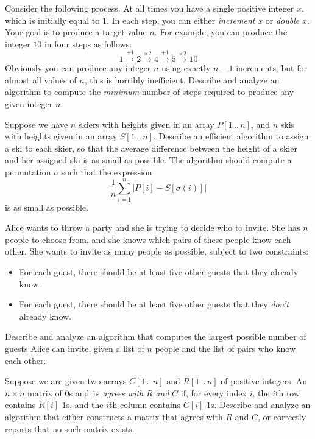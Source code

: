 \begin{exercises}
\item Consider the following process. At all times you have a single positive integer $x$, which is initially equal to $1$. In each step, you can either \textit{increment} $x$ or \textit{double} $x$. Your goal is to produce a target value $n$. For example, you can produce the integer $10$ in four steps as follows:
\[
1 \xrightarrow{+1} 2 \xrightarrow{\times 2} 4 \xrightarrow{+1} 5 \xrightarrow{\times 2} 10
\]
Obviously you can produce any integer $n$ using exactly $n - 1$ increments, but for almost all values of $n$, this is horribly inefficient. Describe and analyze an algorithm to compute the \textit{minimum} number of steps required to produce any given integer $n$.

\item Suppose we have $n$ skiers with heights given in an array $P[1\,..\,n]$, and $n$ skis with heights given in an array $S[1\,..\,n]$. Describe an efficient algorithm to assign a ski to each skier, so that the average difference between the height of a skier and her assigned ski is as small as possible. The algorithm should compute a permutation $\sigma$ such that the expression
\[
\frac{1}{n} \sum_{i=1}^{n} \bigl| P[i] - S[\sigma(i)] \bigr|
\]
is as small as possible.

\item Alice wants to throw a party and she is trying to decide who to invite. She has $n$ people to choose from, and she knows which pairs of these people know each other. She wants to invite as many people as possible, subject to two constraints:
\begin{itemize}
\item For each guest, there should be at least five other guests that they already know.
\item For each guest, there should be at least five other guests that they \textit{don’t} already know.
\end{itemize}
Describe and analyze an algorithm that computes the largest possible number of guests Alice can invite, given a list of $n$ people and the list of pairs who know each other.

\item Suppose we are given two arrays $C[1\,..\,n]$ and $R[1\,..\,n]$ of positive integers. An $n \times n$ matrix of $0$s and $1$s \textit{agrees with} $R$ \textit{and} $C$ if, for every index $i$, the $i$th row contains $R[i]$ $1$s, and the $i$th column contains $C[i]$ $1$s. Describe and analyze an algorithm that either constructs a matrix that agrees with $R$ and $C$, or correctly reports that no such matrix exists.


\end{exercises}
